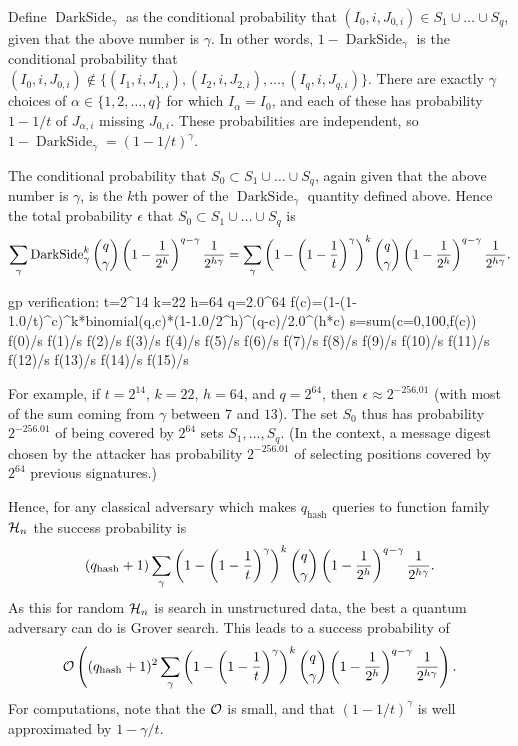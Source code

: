 \def\darkside{\operatorname{DarkSide}}

Define $\darkside_\gamma$
as the conditional probability
that $(I_0,i,J_{0,i})\in S_1\cup\dots\cup S_q$,
given that the above number is $\gamma$.
In other words,
$1-\darkside_\gamma$
is the conditional probability that
$(I_0,i,J_{0,i})\notin \{(I_1,i,J_{1,i}),(I_2,i,J_{2,i}),\dots,(I_q,i,J_{q,i})\}$.
There are exactly $\gamma$ choices of $\alpha\in\{1,2,\dots,q\}$
for which $I_\alpha=I_0$,
and each of these has probability $1-1/t$ of $J_{\alpha,i}$ missing $J_{0,i}$.
These probabilities are independent,
so $1-\darkside_\gamma=(1-1/t)^\gamma$.

The conditional probability that $S_0\subset S_1\cup\dots\cup S_q$,
again given that the above number is $\gamma$,
is the $k$th power of the $\darkside_\gamma$ quantity defined above.
Hence the total probability $\epsilon$ that $S_0\subset S_1\cup\dots\cup S_q$
is
$$
\sum_\gamma
  \darkside_\gamma^k
  {q\choose \gamma}
  \left(1-{1\over 2^h}\right)^{q-\gamma}
  {1\over 2^{h\gamma}}
= \sum_\gamma
  \left(1-\left(1-{1\over t}\right)^\gamma\right)^k
  {q\choose \gamma}
  \left(1-{1\over 2^h}\right)^{q-\gamma}
  {1\over 2^{h\gamma}}
.$$

 gp verification:
t=2^14
k=22
h=64
q=2.0^64
f(c)=(1-(1-1.0/t)^c)^k*binomial(q,c)*(1-1.0/2^h)^(q-c)/2.0^(h*c)
s=sum(c=0,100,f(c))
f(0)/s
f(1)/s
f(2)/s
f(3)/s
f(4)/s
f(5)/s
f(6)/s
f(7)/s
f(8)/s
f(9)/s
f(10)/s
f(11)/s
f(12)/s
f(13)/s
f(14)/s
f(15)/s
\fi

For example,
if $t=2^{14}$, $k=22$, $h=64$, and $q=2^{64}$,
then $\epsilon\approx 2^{-256.01}$
(with most of the sum coming from $\gamma$ between $7$ and $13$).
The set $S_0$ thus has probability $2^{-256.01}$
of being covered by $2^{64}$ sets $S_1,\dots,S_q$.
(In the \spx context,
a message digest chosen by the attacker has probability $2^{-256.01}$
of selecting positions covered by $2^{64}$ previous signatures.)

Hence, for any classical adversary which makes $q_{\text{hash}}$ queries to 
function family $\mathcal{H}_n$ the success probability is 
$$
(q_{\text{hash}}+1) \sum_\gamma
  \left(1-\left(1-{1\over t}\right)^\gamma\right)^k
  {q\choose \gamma}
  \left(1-{1\over 2^h}\right)^{q-\gamma}
  {1\over 2^{h\gamma}}
  .$$
As this for random $\mathcal{H}_n$ is search in unstructured data, the best a quantum 
adversary can do is Grover search. This leads to a success probability of 
$$
\mathcal{O}\left((q_{\text{hash}}+1)^2 \sum_\gamma
  \left(1-\left(1-{1\over t}\right)^\gamma\right)^k
  {q\choose \gamma}
  \left(1-{1\over 2^h}\right)^{q-\gamma}
  {1\over 2^{h\gamma}}\right)
  .$$
For computations, note that the $\mathcal{O}$ is small,
and that $(1-1/t)^\gamma$ is well approximated by $1-\gamma/t$.

